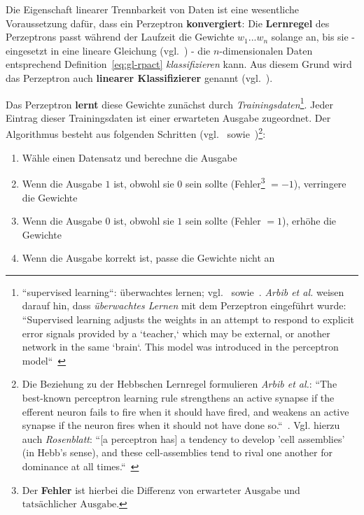 Die Eigenschaft linearer Trennbarkeit von Daten ist eine wesentliche Voraussetzung dafür, dass ein Perzeptron \textbf{konvergiert}: Die \textbf{Lernregel} des Perzeptrons passt während der Laufzeit die Gewichte $w_1 ... w_n$ solange an, bis sie - eingesetzt in eine lineare Gleichung (vgl.~\cite[311]{Ert21b}) - die $n$-dimensionalen Daten entsprechend Definition~\ref{eq:gl-rpact} \textit{klassifizieren} kann.
Aus diesem Grund wird das Perzeptron auch \textbf{linearer Klassifizierer} genannt (vgl.~\cite[210-216]{Ert21a}).

Das Perzeptron \textbf{lernt} diese Gewichte zunächst durch \textit{Trainingsdaten}\footnote{
    ``supervised learning``: überwachtes lernen; vgl.~\cite[811]{RN09} sowie~\cite[15]{Fau94}. \textit{Arbib et al.} weisen darauf hin, dass \textit{überwachtes Lernen} mit dem Perzeptron eingeführt wurde: ``Supervised learning adjusts the weights in an attempt to respond to explicit error signals provided by a `teacher,` which may be external, or another network in the same `brain`. This model was introduced in the perceptron model``~\cite[30]{Arb03}
}.
Jeder Eintrag dieser Trainingsdaten ist einer erwarteten Ausgabe zugeordnet. Der Algorithmus besteht aus folgenden Schritten (vgl.~\cite[65]{RM87} sowie~\cite[842]{RN09})\footnote{
    Die Beziehung zu der Hebbschen Lernregel formulieren \textit{Arbib et al.}:
        ``The best-known perceptron learning rule strengthens an active synapse if the efferent neuron fails to fire when it should have fired, and weakens an active synapse if the neuron fires when it should not have done so.``~\cite[20]{Arb03}.
        Vgl. hierzu auch \textit{Rosenblatt}: ``[a perceptron has] a tendency to develop 'cell assemblies' (in Hebb's sense), and these cell-assemblies tend to rival one another for dominance at all times.``~\cite[464]{Ros62}
}:



\begin{enumerate}
    \item Wähle einen Datensatz und berechne die Ausgabe
    \item Wenn die Ausgabe $1$ ist, obwohl sie $0$ sein sollte (Fehler\footnote{
    Der \textbf{Fehler} ist hierbei die Differenz von $\text{erwarteter Ausgabe}$ und $\text{tatsächlicher Ausgabe}$.
    } $=-1$), verringere die Gewichte
    \item Wenn die Ausgabe $0$ ist, obwohl sie $1$ sein sollte  (Fehler $=1$), erhöhe die Gewichte
    \item Wenn die Ausgabe korrekt ist, passe die Gewichte nicht an
\end{enumerate}

